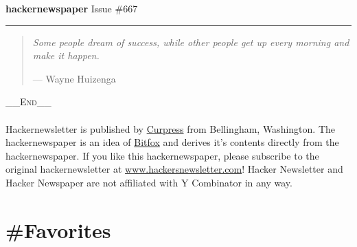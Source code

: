 \documentclass[10pt,a4paper]{article}
\begin{document}
\thispagestyle{empty}
\Huge {} 
\noindent\textbf{hacker{\color{red}news}paper}
\normalfont
\normalsize
\hfill Issue \#667

{\noindent\color{red} \rule{\linewidth}{0.5mm}}

\begin{quotation}
    \textit{
Some people dream of success, while other people get up every morning and make it happen. } \par\hfill --- Wayne Huizenga

 
\end{quotation}

\tableofcontents
\vfill
\noindent\color{gray}
\huge \textsc{\_\_End\_\_ } \\ \\ 
\small Hackernewsletter is published by \href{www.curpress.com}{Curpress} from Bellingham, Washington. The hackernewspaper is an idea of \href{www.bitfox.nl}{Bitfox} and derives it's contents directly from the hackernewspaper. If you like this hackernewspaper, please subscribe to the original hackernewsletter at \href{www.hackersnewsletter.com}{www.hackersnewsletter.com}! Hacker Newsletter and Hacker Newspaper are not affiliated with Y Combinator in any way.

\color{black}

\newpage
\pagestyle{fancy}

\section{\#Favorites}
\end{document}

